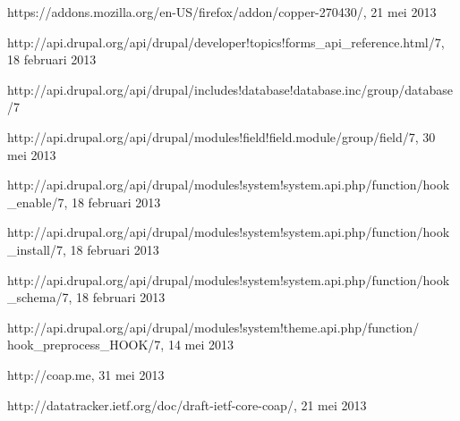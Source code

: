 \begin{thebibliography}{99}

 
 



 https://addons.mozilla.org/en-US/firefox/addon/copper-270430/, 21 mei 2013

 http://api.drupal.org/api/drupal/developer!topics!forms\_api\_reference.html/7, 18 februari 2013

 http://api.drupal.org/api/drupal/includes!database!database.inc/group/database/7

 http://api.drupal.org/api/drupal/modules!field!field.module/group/field/7, 30 mei 2013

 http://api.drupal.org/api/drupal/modules!system!system.api.php/function/hook\_enable/7, 18 februari 2013

 http://api.drupal.org/api/drupal/modules!system!system.api.php/function/hook\_install/7, 18 februari 2013

 http://api.drupal.org/api/drupal/modules!system!system.api.php/function/hook\_schema/7, 18 februari 2013

 http://api.drupal.org/api/drupal/modules!system!theme.api.php/function/ hook\_preprocess\_HOOK/7, 14 mei 2013

 http://coap.me, 31 mei 2013

 http://datatracker.ietf.org/doc/draft-ietf-core-coap/, 21 mei 2013


\end{thebibliography}
